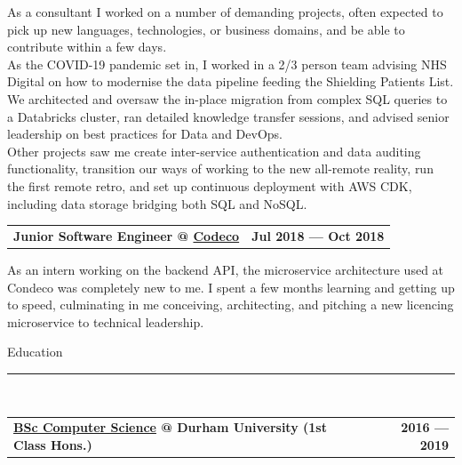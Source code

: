 \documentclass[hidelinks, 12pt, a4paper]{article}
\begin{document}
	\hspace{0.05\linewidth}\begin{minipage}{0.95\linewidth}
		As a consultant I worked on a number of demanding projects, often expected to pick up new languages, technologies, or business domains, and be able to contribute within a few days.\\
		
		As the COVID-19 pandemic set in, I worked in a 2/3 person team advising NHS Digital on how to modernise the data pipeline feeding the Shielding Patients List.
		We architected and oversaw the in-place migration from complex SQL queries to a Databricks cluster, ran detailed knowledge transfer sessions, and advised senior leadership on best practices for Data and DevOps.\\
		
		Other projects saw me create inter-service authentication and data auditing functionality,
		transition our ways of working to the new all-remote reality, run the first remote retro, and set up continuous deployment with AWS CDK, including data storage bridging both SQL and NoSQL.\\
	\end{minipage}


	\begin{tabularx}{\linewidth}{X r}
		\textbf{Junior Software Engineer @ \href{https://www.condecoconnect.com/}{Codeco}} & \textbf{Jul 2018 --- Oct 2018}
	\end{tabularx}\vspace{2pt}

	\hspace{0.05\linewidth}\begin{minipage}{0.95\linewidth}
		As an intern working on the backend API, the microservice architecture used at Condeco was completely new to me.
		I spent a few months learning and getting up to speed, culminating in me conceiving, architecting, and pitching a new licencing microservice to technical leadership.
	\end{minipage}
	
	\begin{Large}Education\end{Large}
	\rule{200pt}{1pt}\\
	
	
	\begin{tabularx}{\linewidth}{X r}
		\textbf{\href{https://www.dur.ac.uk/courses/info/?id=11509\&title=Computer+Science\&code=G400\&type=BSC\&year=2016}{BSc Computer Science} @ Durham University (1st Class Hons.)} & \textbf{2016 --- 2019}
	\end{tabularx}\vspace{2pt}
\end{document}
